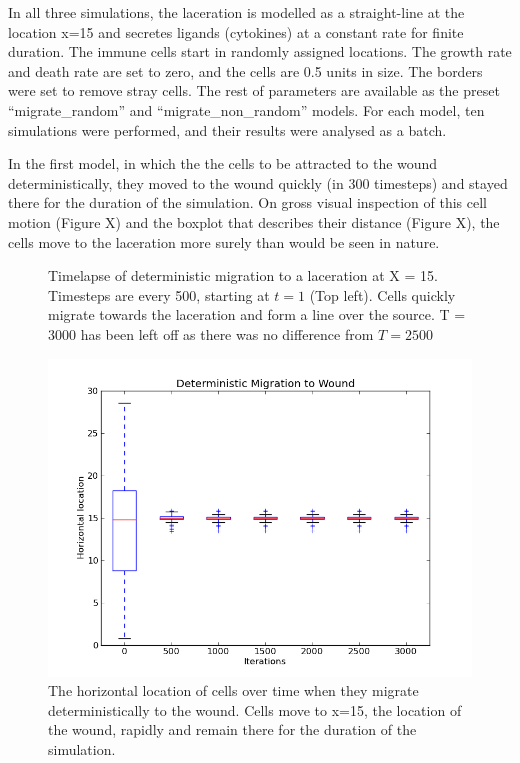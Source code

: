 \documentclass[12pt]{article}
\begin{document}
In all three simulations, the laceration is modelled as a straight-line 
at the location x=15 and secretes ligands (cytokines) at a constant rate 
for finite duration. The immune cells start in randomly assigned 
locations. The growth rate and death rate are set to zero, and the cells 
are 0.5 units in size. The borders were set to remove stray cells. The 
rest of parameters are available as the preset ``migrate\_random'' and 
``migrate\_non\_random'' models. For each model, ten simulations were 
performed, and their results were analysed as a batch.

In the first model, in which the the cells to be attracted to the wound 
deterministically, they moved to the wound quickly (in 300 timesteps) 
and stayed there for the duration of the simulation. On gross visual 
inspection of this cell motion (Figure X) and the boxplot that describes 
their distance (Figure X), the cells move to the laceration more surely 
than would be seen in nature.

\begin{figure}[H]
\centering
\caption{Timelapse of deterministic 
migration to a laceration at X = 15. Timesteps are every 500, starting 
at \(t = 1\) (Top left). Cells quickly migrate towards the laceration and 
form a line over the source. T = 3000 has been left off as there was no 
difference from \(T = 2500\)}
\end{figure}

\begin{figure}[H]
\centering
\includegraphics[width=14.51cm]{media/DetMigrationtoWound.png}
\caption{The horizontal location of cells over time when 
they migrate deterministically to the wound. Cells move to x=15, the 
location of the wound, rapidly and remain there for the duration of the 
simulation.}
\end{figure}
\end{document}
